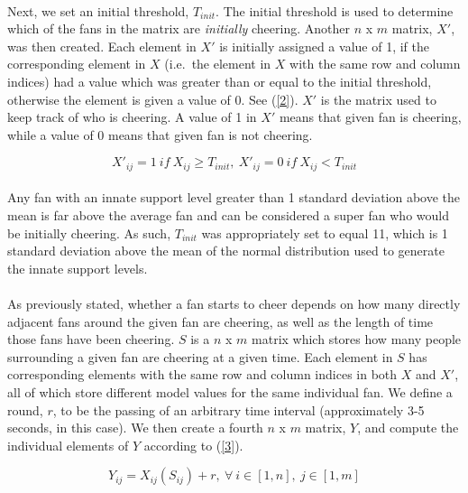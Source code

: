 \documentclass[oneside,12pt]{report}
\begin{document}
\paragraph{}
Next, we set an initial threshold, $T_{init}$. The initial threshold is used to determine which of the fans in the matrix are \textit{initially} cheering. Another $n$ x $m$ matrix, $X'$, was then created. Each element in $X'$ is initially assigned a value of 1, if the corresponding element in $X$ (i.e.~the element in $X$ with the same row and column indices) had a value which was greater than or equal to the initial threshold, otherwise the element is given a value of 0. See (\ref{2}). $X'$ is the matrix used to keep track of who is cheering. A value of 1 in $X'$ means that given fan is cheering, while a value of 0 means that given fan is not cheering. 

\begin{equation}
X'_{ij}=1~if~X_{ij}\geq T_{init},~X'_{ij}=0~if~X_{ij}<T_{init}
\label{2}
\end{equation}

\paragraph{}
Any fan with an innate support level greater than 1 standard deviation above the mean is far above the average fan and can be considered a super fan who would be initially cheering. As such, $T_{init}$ was appropriately set to equal 11, which is 1 standard deviation above the mean of the normal distribution used to generate the innate support levels.

\paragraph{}
As previously stated, whether a fan starts to cheer depends on how many directly adjacent fans around the given fan are cheering, as well as the length of time those fans have been cheering. $S$ is a $n$ x $m$ matrix which stores how many people surrounding a given fan are cheering at a given time. Each element in $S$ has corresponding elements with the same row and column indices in both $X$ and $X'$, all of which store different model values for the same individual fan. We define a round, $r$, to be the passing of an arbitrary time interval (approximately 3-5 seconds, in this case). We then create a fourth $n$ x $m$ matrix, $Y$, and compute the individual elements of $Y$ according to (\ref{3}). 

\begin{equation}
Y_{ij}=X_{ij}(S_{ij})+r,~\forall~i\in[1,n],~j\in[1,m]
\label{3}
\end{equation}
\end{document}
